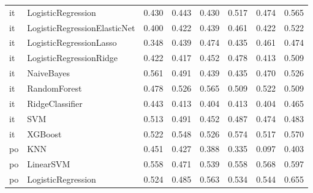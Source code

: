 \begin{tabular}{llllllll}
      it &           LogisticRegression &     0.430 &                     0.443 &                 0.430 &                  0.517 &                                   0.474 &     0.565 \\
      it & LogisticRegressionElasticNet &     0.400 &                     0.422 &                 0.439 &                  0.461 &                                   0.422 &     0.522 \\
      it &      LogisticRegressionLasso &     0.348 &                     0.439 &                 0.474 &                  0.435 &                                   0.461 &     0.474 \\
      it &      LogisticRegressionRidge &     0.422 &                     0.417 &                 0.452 &                  0.478 &                                   0.413 &     0.509 \\
      it &                   NaiveBayes &     0.561 &                     0.491 &                 0.439 &                  0.435 &                                   0.470 &     0.526 \\
      it &                 RandomForest &     0.478 &                     0.526 &                 0.565 &                  0.509 &                                   0.522 &     0.509 \\
      it &              RidgeClassifier &     0.443 &                     0.413 &                 0.404 &                  0.413 &                                   0.404 &     0.465 \\
      it &                          SVM &     0.513 &                     0.491 &                 0.452 &                  0.487 &                                   0.474 &     0.483 \\
      it &                      XGBoost &     0.522 &                     0.548 &                 0.526 &                  0.574 &                                   0.517 &     0.570 \\
      po &                          KNN &     0.451 &                     0.427 &                 0.388 &                  0.335 &                                   0.097 &     0.403 \\
      po &                    LinearSVM &     0.558 &                     0.471 &                 0.539 &                  0.558 &                                   0.568 &     0.597 \\
      po &           LogisticRegression &     0.524 &                     0.485 &                 0.563 &                  0.534 &                                   0.544 &     0.655 \\

\end{tabular}
